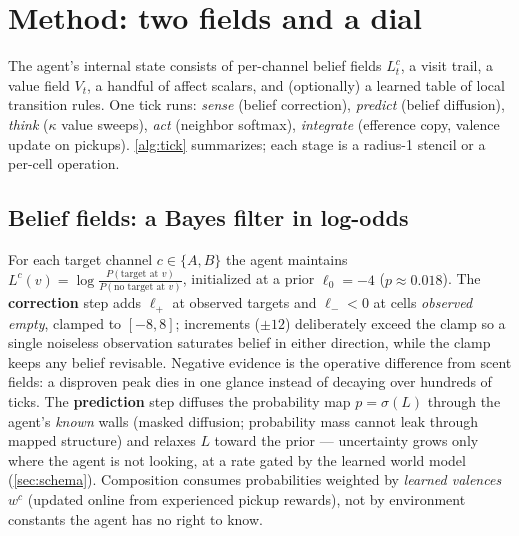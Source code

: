 \documentclass[11pt]{article}
\begin{document}
\section{Method: two fields and a dial}
\label{sec:method}
The agent's internal state consists of per-channel belief fields $L^c_t$, a visit trail, a value field $V_t$, a handful of affect scalars, and (optionally) a learned table of local transition rules. One tick runs: \emph{sense} (belief correction), \emph{predict} (belief diffusion), \emph{think} ($\kappa$ value sweeps), \emph{act} (neighbor softmax), \emph{integrate} (efference copy, valence update on pickups). \cref{alg:tick} summarizes; each stage is a radius-1 stencil or a per-cell operation.

\subsection{Belief fields: a Bayes filter in log-odds}
\label{sec:beliefs}
For each target channel $c\in\{A,B\}$ the agent maintains $L^c(v) = \log \frac{P(\text{target at } v)}{P(\text{no target at } v)}$, initialized at a prior $\ell_0=-4$ ($p\approx0.018$). The \textbf{correction} step adds $\ell_+$ at observed targets and $\ell_-<0$ at cells \emph{observed empty}, clamped to $[-8,8]$; increments ($\pm12$) deliberately exceed the clamp so a single noiseless observation saturates belief in either direction, while the clamp keeps any belief revisable. Negative evidence is the operative difference from scent fields: a disproven peak dies in one glance instead of decaying over hundreds of ticks. The \textbf{prediction} step diffuses the probability map $p=\sigma(L)$ through the agent's \emph{known} walls (masked diffusion; probability mass cannot leak through mapped structure) and relaxes $L$ toward the prior --- uncertainty grows only where the agent is not looking, at a rate gated by the learned world model (\cref{sec:schema}). Composition consumes probabilities weighted by \emph{learned valences} $w^c$ (updated online from experienced pickup rewards), not by environment constants the agent has no right to know.
\end{document}
